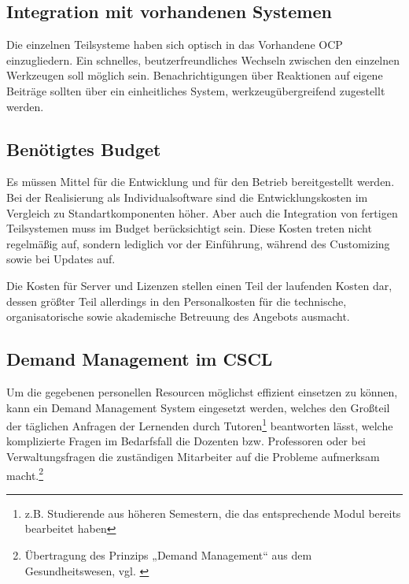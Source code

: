 \subsection{Integration mit vorhandenen Systemen} %
\label{sub:integration_mit_vorhandenen_systemen}
Die einzelnen Teilsysteme haben sich optisch in das Vorhandene \ac{OCP} einzugliedern. Ein schnelles, beutzerfreundliches Wechseln zwischen den einzelnen Werkzeugen soll möglich sein. Benachrichtigungen über Reaktionen auf eigene Beiträge sollten über ein einheitliches System, werkzeugübergreifend zugestellt werden.

\subsection{Benötigtes Budget} %
\label{sub:benotigtes_budget}
Es müssen Mittel für die Entwicklung und für den Betrieb bereitgestellt werden. Bei der Realisierung als Individualsoftware sind die Entwicklungskosten im Vergleich zu Standartkomponenten höher. Aber auch die Integration von fertigen Teilsystemen muss im Budget berücksichtigt sein. Diese Kosten treten nicht regelmäßig auf, sondern lediglich vor der Einführung, während des Customizing sowie bei Updates auf.

Die Kosten für Server und Lizenzen stellen einen Teil der laufenden Kosten dar, dessen größter Teil allerdings in den Personalkosten für die technische, organisatorische sowie akademische Betreuung des Angebots ausmacht.


\subsection{Demand Management im CSCL} %
\label{sub:demand_management}
Um die gegebenen personellen Resourcen möglichst effizient einsetzen zu können, kann ein Demand Management System eingesetzt werden, welches den Großteil der täglichen Anfragen der Lernenden durch Tutoren\footnote{z.B. Studierende aus höheren Semestern, die das entsprechende Modul bereits bearbeitet haben} beantworten lässt, welche komplizierte Fragen im Bedarfsfall die Dozenten bzw. Professoren oder bei Verwaltungsfragen  die zuständigen Mitarbeiter auf die Probleme aufmerksam macht.\footnote{Übertragung des Prinzips „Demand Management“ aus dem Gesundheitswesen, vgl. \cite{gabler:demandmanagement}}

